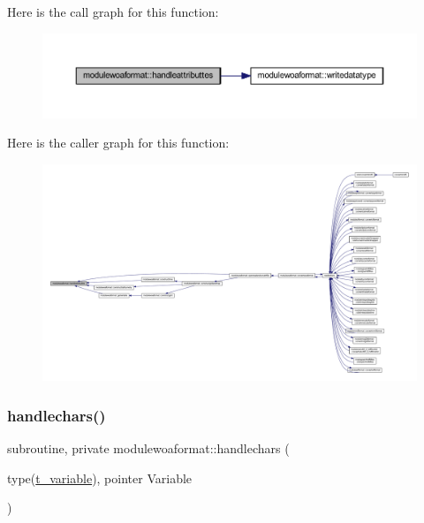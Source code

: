 Here is the call graph for this function\+:\nopagebreak
\begin{figure}[H]
\begin{center}
\leavevmode
\includegraphics[width=350pt]{namespacemodulewoaformat_a54028cfada0d5c06f32d22ec3050fc95_cgraph}
\end{center}
\end{figure}
Here is the caller graph for this function\+:\nopagebreak
\begin{figure}[H]
\begin{center}
\leavevmode
\includegraphics[width=350pt]{namespacemodulewoaformat_a54028cfada0d5c06f32d22ec3050fc95_icgraph}
\end{center}
\end{figure}
\mbox{\label{namespacemodulewoaformat_a30b457447914696134f34e0ad5f8a6e0}} 
\subsubsection{\texorpdfstring{handlechars()}{handlechars()}}
{\footnotesize\ttfamily subroutine, private modulewoaformat\+::handlechars (\begin{DoxyParamCaption}\item[{type(\mbox{\hyperlink{structmodulewoaformat_1_1t__variable}{t\+\_\+variable}}), pointer}]{Variable }\end{DoxyParamCaption})\hspace{0.3cm}{\ttfamily [private]}}

